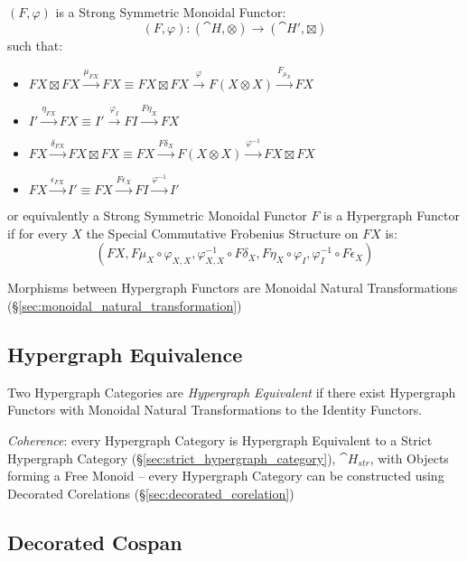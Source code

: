 $(F,\varphi)$ is a Strong Symmetric Monoidal Functor:
\[
  (F,\varphi) : (\cat{H},\otimes) \rightarrow (\cat{H}',\boxtimes)
\]
such that:
\begin{itemize}
  \item $FX \boxtimes FX \xrightarrow{\mu_{FX}} FX
    \equiv FX \boxtimes FX \xrightarrow{\varphi} F(X \otimes X)
      \xrightarrow{F_{\mu_X}} FX$
  \item $I' \xrightarrow{\eta_{FX}} FX
    \equiv I' \xrightarrow{\varphi_I} FI \xrightarrow{F \eta_X} FX$
  \item $FX \xrightarrow{\delta_{FX}} FX \boxtimes FX
    \equiv FX \xrightarrow{F\delta_X} F(X \otimes X)
      \xrightarrow{\varphi^{-1}} FX \boxtimes FX$
  \item $FX \xrightarrow{\epsilon_{FX}} I'
    \equiv FX \xrightarrow{F \epsilon_X} FI
      \xrightarrow{\varphi^{-1}} I'$
\end{itemize} %
or equivalently a Strong Symmetric Monoidal Functor $F$ is a
Hypergraph Functor if for every $X$ the Special Commutative Frobenius
Structure on $FX$ is:
\[
  (FX, F\mu_X \circ \varphi_{X,X}, \varphi^{-1}_{X,X} \circ F\delta_X,
    F\eta_X \circ \varphi_I, \varphi^{-1}_I \circ F\epsilon_X)
\]

Morphisms between Hypergraph Functors are Monoidal Natural
Transformations (\S\ref{sec:monoidal_natural_transformation})



\subsection{Hypergraph Equivalence}\label{sec:hypergraph_equivalence}

Two Hypergraph Categories are \emph{Hypergraph Equivalent} if there
exist Hypergraph Functors with Monoidal Natural Transformations to the
Identity Functors.

\emph{Coherence}: every Hypergraph Category is Hypergraph Equivalent
to a Strict Hypergraph Category
(\S\ref{sec:strict_hypergraph_category}), $\cat{H}_{str}$, with
Objects forming a Free Monoid -- every Hypergraph Category can be
constructed using Decorated Corelations
(\S\ref{sec:decorated_corelation})



\subsection{Decorated Cospan}\label{sec:decorated_cospan}

